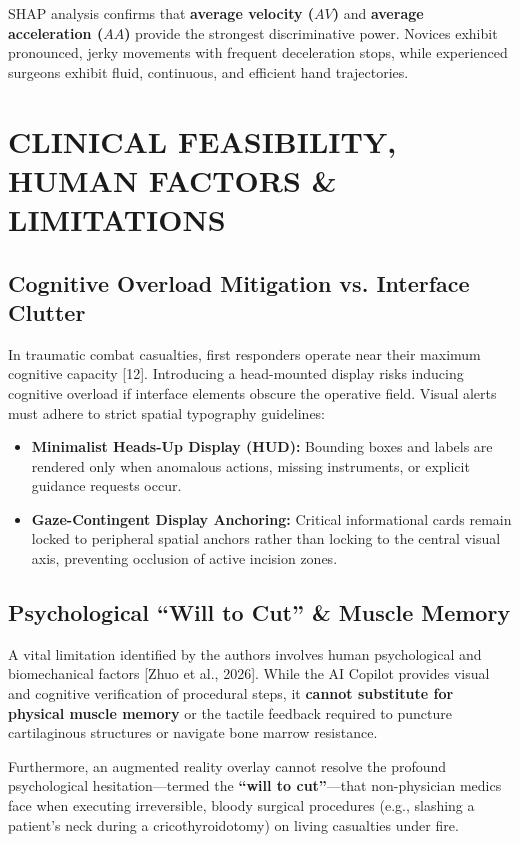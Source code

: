 \documentclass[12pt,a4paper]{report}
\begin{document}
SHAP analysis confirms that \textbf{average velocity ($AV$)} and \textbf{average acceleration ($AA$)} provide the strongest discriminative power. Novices exhibit pronounced, jerky movements with frequent deceleration stops, while experienced surgeons exhibit fluid, continuous, and efficient hand trajectories.

\section{CLINICAL FEASIBILITY, HUMAN FACTORS \& LIMITATIONS}

\subsection{Cognitive Overload Mitigation vs. Interface Clutter}
In traumatic combat casualties, first responders operate near their maximum cognitive capacity [12]. Introducing a head-mounted display risks inducing cognitive overload if interface elements obscure the operative field. Visual alerts must adhere to strict spatial typography guidelines:
\begin{itemize}
    \item \textbf{Minimalist Heads-Up Display (HUD):} Bounding boxes and labels are rendered only when anomalous actions, missing instruments, or explicit guidance requests occur.
    \item \textbf{Gaze-Contingent Display Anchoring:} Critical informational cards remain locked to peripheral spatial anchors rather than locking to the central visual axis, preventing occlusion of active incision zones.
\end{itemize}

\subsection{Psychological ``Will to Cut'' \& Muscle Memory}
A vital limitation identified by the authors involves human psychological and biomechanical factors [Zhuo et al., 2026]. While the AI Copilot provides visual and cognitive verification of procedural steps, it \textbf{cannot substitute for physical muscle memory} or the tactile feedback required to puncture cartilaginous structures or navigate bone marrow resistance.

Furthermore, an augmented reality overlay cannot resolve the profound psychological hesitation---termed the \textbf{``will to cut''}---that non-physician medics face when executing irreversible, bloody surgical procedures (e.g., slashing a patient's neck during a cricothyroidotomy) on living casualties under fire.
\end{document}
